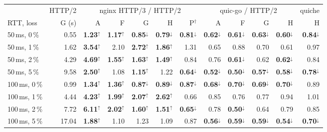 \begin{tabular}{@{}lr|rrrr|r|rrrr|r@{}}
\toprule
 & HTTP/2 & \multicolumn{5}{c|}{nginx HTTP/3 / HTTP/2} & \multicolumn{4}{c|}{quic-go / HTTP/2} & quiche \\
RTT, loss & G (s) & A & F & G & H & P$^\dagger$ & A & F & G & H & H \\
\midrule
50\,ms, 0\,\% & 0.55 & \textbf{1.23}$^{\uparrow}$ & \textbf{1.17}$^{\uparrow}$ & \textbf{0.85}$^{\downarrow}$ & \textbf{0.79}$^{\downarrow}$ & \textbf{0.81}$^{\downarrow}$ & \textbf{0.62}$^{\downarrow}$ & \textbf{0.61}$^{\downarrow}$ & \textbf{0.63}$^{\downarrow}$ & \textbf{0.60}$^{\downarrow}$ & \textbf{0.84}$^{\downarrow}$ \\
50\,ms, 1\,\% & 1.62 & \textbf{3.54}$^{\uparrow}$ & 2.10 & \textbf{2.72}$^{\uparrow}$ & \textbf{1.86}$^{\uparrow}$ & 1.31 & 0.65 & 0.88 & 0.70 & 0.61 & 0.97 \\
50\,ms, 2\,\% & 4.29 & \textbf{4.69}$^{\uparrow}$ & \textbf{1.55}$^{\uparrow}$ & \textbf{1.63}$^{\uparrow}$ & \textbf{1.49}$^{\uparrow}$ & 0.84 & 0.76 & \textbf{0.61}$^{\downarrow}$ & 0.62 & \textbf{0.62}$^{\downarrow}$ & 0.84 \\
50\,ms, 5\,\% & 9.58 & \textbf{2.50}$^{\uparrow}$ & 1.08 & \textbf{1.15}$^{\uparrow}$ & 1.22 & \textbf{0.64}$^{\downarrow}$ & \textbf{0.52}$^{\downarrow}$ & \textbf{0.50}$^{\downarrow}$ & \textbf{0.57}$^{\downarrow}$ & \textbf{0.58}$^{\downarrow}$ & \textbf{0.78}$^{\downarrow}$ \\
\midrule
100\,ms, 0\,\% & 0.99 & \textbf{1.34}$^{\uparrow}$ & \textbf{1.36}$^{\uparrow}$ & \textbf{0.87}$^{\downarrow}$ & \textbf{0.89}$^{\downarrow}$ & \textbf{0.87}$^{\downarrow}$ & \textbf{0.68}$^{\downarrow}$ & \textbf{0.70}$^{\downarrow}$ & \textbf{0.69}$^{\downarrow}$ & \textbf{0.70}$^{\downarrow}$ & 0.89 \\
100\,ms, 1\,\% & 4.44 & \textbf{4.23}$^{\uparrow}$ & \textbf{1.99}$^{\uparrow}$ & \textbf{2.07}$^{\uparrow}$ & \textbf{2.62}$^{\uparrow}$ & 0.66 & 0.85 & 0.76 & 0.77 & 0.94 & 1.01 \\
100\,ms, 2\,\% & 7.72 & \textbf{6.11}$^{\uparrow}$ & \textbf{2.02}$^{\uparrow}$ & \textbf{1.60}$^{\uparrow}$ & \textbf{1.51}$^{\uparrow}$ & \textbf{0.65}$^{\downarrow}$ & 0.78 & \textbf{0.50}$^{\downarrow}$ & 0.64 & 0.79 & 0.85 \\
100\,ms, 5\,\% & 17.04 & \textbf{1.88}$^{\uparrow}$ & 1.10 & 1.23 & 1.09 & 0.87 & \textbf{0.56}$^{\downarrow}$ & \textbf{0.59}$^{\downarrow}$ & \textbf{0.59}$^{\downarrow}$ & \textbf{0.54}$^{\downarrow}$ & \textbf{0.70}$^{\downarrow}$ \\
\bottomrule
\end{tabular}
